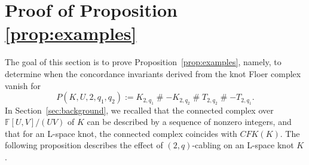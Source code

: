 \documentclass[11pt, reqno]{amsart}
\newtheorem{proposition}[theorem]{Proposition}
\theoremstyle{definition}
\theoremstyle{remark}
\newtheorem{remark}[theorem]{Remark}
\def\F{\mathbb{F}}
\def\CFK{\mathit{CFK}}
\numberwithin{equation}{section}
\begin{document}
%
%
%







\section{Proof of Proposition \ref{prop:examples}}\label{sec:computations}

The goal of this section is to prove Proposition~\ref{prop:examples}, namely, to determine when the concordance invariants derived from the knot Floer complex vanish for
\[
P(K, U, 2, q_1, q_2) := K_{2,q_1} \mathbin{\#} -K_{2,q_2} \mathbin{\#} T_{2,q_2} \mathbin{\#} -T_{2,q_1}.
\]
In Section~\ref{sec:background}, we recalled that the connected complex over $\F[U,V]/(UV)$ of $K$ can be described by a sequence of nonzero integers, and that for an L-space knot, the connected complex coincides with $\CFK(K)$. The following proposition describes the effect of $(2,q)$-cabling on an L-space knot $K$.
\end{document}
